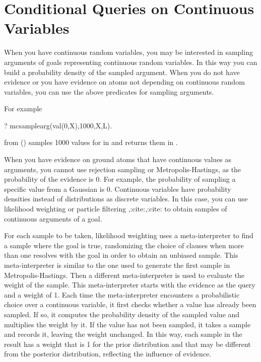 \documentclass[letterpaper,10pt,english]{sphinxmanual}
\begin{document}
\section{Conditional Queries on Continuous Variables}
\label{\detokenize{index:conditional-queries-on-continuous-variables}}
When you have continuous random variables, you may be interested in sampling arguments of goals representing continuous random variables.
In this way you can build a probability density of the sampled argument.
When you do not have evidence or you have evidence on atoms not depending on continuous random variables, you can use the above predicates for sampling arguments.

For example

\begin{sphinxVerbatim}[commandchars=\\\{\}]
?\PYGZhy{} mc\PYGZus{}sample\PYGZus{}arg(val(0,X),1000,X,L).
\end{sphinxVerbatim}

from () samples 1000 values for  in  and returns them in .

When you have evidence on ground atoms that have continuous values as arguments, you cannot use rejection sampling or Metropolis-Hastings, as the probability of the evidence is 0. For example, the probability of sampling a specific value from a Gaussian is 0.
Continuous variables have probability densities instead of distributions as discrete variables. In this case, you can use likelihood weighting or particle filtering ,:cite:,:cite: to obtain samples of continuous arguments of a goal.

For each sample to be taken, likelihood weighting uses a meta-interpreter to find a sample where the goal is true, randomizing the choice of clauses when more than one resolves with the goal in order to obtain an unbiased sample.
This meta-interpreter is similar to the one used to generate the first sample in Metropolis-Hastings.
Then a different meta-interpreter is used to evaluate the weight of the sample.
This meta-interpreter starts with the evidence as the query and a weight of 1.
Each time the meta-interpreter encounters a probabilistic choice over a continuous variable, it first checks whether a value has already been sampled.
If so, it computes the probability density of the sampled value and multiplies the weight by it.
If the value has not been sampled, it takes a sample and records it, leaving the weight unchanged.
In this way, each sample in the result has a weight that is 1 for the prior distribution and that may be different from the posterior distribution, reflecting the influence of evidence.
\end{document}
